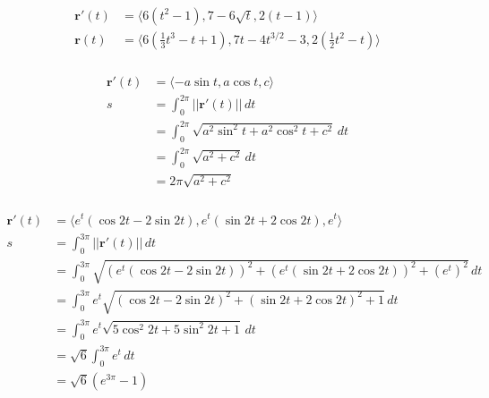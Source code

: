 \documentclass{article}
\begin{document}
\setcounter{subsubsection}{38}
\subsubsection{}

\begin{align*}
  \mathbf{r}'(t) & = \langle 6 (t^2 - 1), 7 - 6 \sqrt{t}, 2 (t - 1) \rangle                                                                \\
  \mathbf{r}(t)  & = \langle 6 \left( \frac{1}{3} t^3 - t + 1 \right), 7 t - 4 t^{3 / 2} - 3, 2 \left( \frac{1}{2} t^2 - t \right) \rangle
\end{align*}

\setcounter{subsubsection}{40}
\subsubsection{}

\begin{align*}
  \mathbf{r}'(t) & = \langle -a \sin t, a \cos t, c \rangle                       \\
  s              & = \int_0^{2 \pi} ||\mathbf{r}'(t)|| \,dt                       \\
                 & = \int_0^{2 \pi} \sqrt{a^2 \sin^2 t + a^2 \cos^2 t + c^2} \,dt \\
                 & = \int_0^{2 \pi} \sqrt{a^2 + c^2} \,dt                         \\
                 & = 2 \pi \sqrt{a^2 + c^2}
\end{align*}

\setcounter{subsubsection}{42}
\subsubsection{}

\begin{align*}
  \mathbf{r}'(t) & = \langle e^t (\cos 2 t - 2 \sin 2 t), e^t (\sin 2 t + 2 \cos 2 t), e^t \rangle                          \\
  s              & = \int_0^{3 \pi} ||\mathbf{r}'(t)|| \,dt                                                                 \\
                 & = \int_0^{3 \pi} \sqrt{(e^t (\cos 2 t - 2 \sin 2 t))^2 + (e^t (\sin 2 t + 2 \cos 2 t))^2 + (e^t)^2} \,dt \\
                 & = \int_0^{3 \pi} e^t \sqrt{(\cos 2 t - 2 \sin 2 t)^2 + (\sin 2 t + 2 \cos 2 t)^2 + 1} \,dt               \\
                 & = \int_0^{3 \pi} e^t \sqrt{5 \cos^2 2 t + 5 \sin^2 2 t + 1} \,dt                                         \\
                 & = \sqrt{6} \int_0^{3 \pi} e^t \,dt                                                                       \\
                 & = \sqrt{6} (e^{3 \pi} - 1)
\end{align*}
\end{document}

